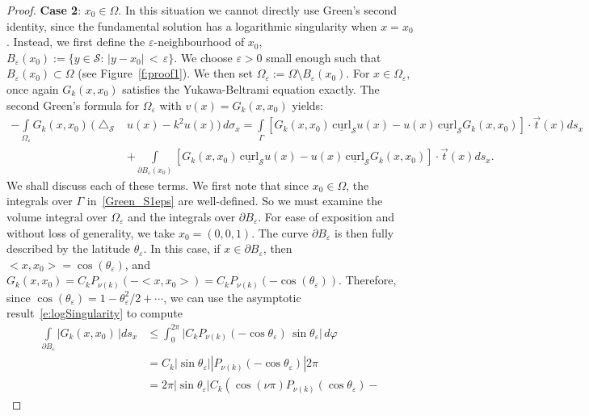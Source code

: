 \documentclass[final]{siamltex}
\newcommand{\lap}{\bigtriangleup}
\newcommand{\C}{C_k}
\renewcommand{\S} {\mathcal{S}}
\begin{document}
\begin{proof}
{\bf Case 2}:  $x_0\in \Omega$.  In this situation  we cannot directly
use Green's second identity, since the fundamental solution has
a logarithmic singularity when $x=x_0$. Instead, we first define the
$\varepsilon$-neighbourhood of $x_0$,
$B_{\varepsilon}(x_0):=\{y\in{\S}:\, |y-x_0| \,<\, \varepsilon\}$. We
choose $\varepsilon>0$ small enough such that
$B_\varepsilon(x_{0})\subset \Omega$ (see Figure~\ref{f:proof1}). We
then set ${\Omega}_{\varepsilon}:=\Omega\setminus
B_{\varepsilon}(x_0)$. For $x\in \Omega_\varepsilon$, once again
$G_k(x,x_0)$ satisfies the Yukawa-Beltrami equation exactly.   The
second Green's formula for $\Omega_{\varepsilon}$ with
$v(x)=G_k(x,x_0)$ yields:
\begin{align}
  - \int\limits_{\Omega_{\varepsilon}} G_k(x,x_0)\,
    (\lap_{\S}& u(x) -k^2u(x))\,d\sigma_x = 
    \int\limits_\Gamma [ G_k(x,x_0)\,\underline{\mbox{curl}}_{\S} 
    u(x) - u(x)\,\underline{\mbox{curl}}_{\S} G_k(x,x_0)] \cdot 
    \vec{t}(x) ds_x \nonumber \\
  &+\int\limits_{\partial B_{\varepsilon}(x_0)} [
    G_k(x,x_0)\,\underline{\mbox{curl}}_{\S} u(x) -
    u(x)\,\underline{\mbox{curl}}_{\S} G_k(x,x_0)]\cdot 
    \vec{t}(x) ds_{x}.
  \label{Green_S1eps}
\end{align}
We shall discuss each of these terms. We first note that since
$x_{0}\in \Omega$, the integrals over $\Gamma$ in~\eqref{Green_S1eps}
are well-defined. So we must examine the volume integral over
$\Omega_\varepsilon$ and the integrals over $\partial B_\varepsilon$.
For ease of exposition and without loss of generality, we take
$x_{0}=(0,0,1)$.  The curve $\partial B_{\varepsilon}$ is then fully
described by the latitude $\theta_{\varepsilon}$.  In this case, if
$x\in \partial B_\varepsilon$, then $<x,x_{0}> =
\cos(\theta_\varepsilon)$, and  $G_k(x,x_0) = \C
P_{\nu(k)}\left(-<x,x_{0}>\right) = \C
P_{\nu(k)}\left(-\cos(\theta_\varepsilon)\right).$ Therefore, since
$\cos(\theta_\varepsilon) = 1- \theta^2_\varepsilon/2 + \cdots$, we can
use the asymptotic result~\eqref{e:logSingularity} to compute
\begin{align*}
 \int\limits_{\partial B_{\varepsilon}}\vert G_k(x,x_0)\,\vert  ds_x 
  &\leq \int_{0}^{2\pi}\vert \C P_{\nu(k)}(-\cos\theta_{\varepsilon})  
    \, \sin\theta_{\varepsilon}| \, d\varphi \\
  &= \C|\sin\theta_{\varepsilon}|
    |P_{\nu(k)}(-\cos\theta_{\varepsilon}) | 2\pi \\
  &= 2 \pi |\sin\theta_{\varepsilon}|\C \left(\cos(\nu\pi) 
    P_{\nu(k)}(\cos \theta_\varepsilon) - 

\end{align*}
\end{proof}
\end{document}
